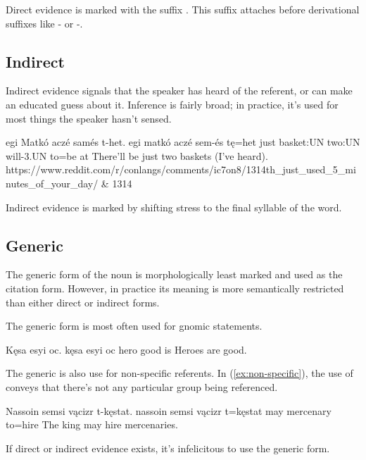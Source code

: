 Direct evidence is marked with the suffix . This suffix attaches before derivational suffixes like - or -.

\subsection{Indirect}
Indirect evidence signals that the speaker has heard of the referent, or can make an educated guess about it. Inference is fairly broad; in practice, it's used for most things the speaker hasn't sensed. 

\begin{examples*}
    \ex \label{ex:indirect_evidence}
        \script egi Matkó aczé samés t-het.
        \bits egi matkó aczé sem-és tę=het
        \gloss just basket:UN two:UN will-3.UN to={be at}
        \tr There'll be just two baskets (I've heard).
        \smoyd https://www.reddit.com/r/conlangs/comments/ic7on8/1314th_just_used_5_minutes_of_your_day/ & 1314
\end{examples*}

Indirect evidence is marked by shifting stress to the final syllable of the word.

\subsection{Generic}
The generic form of the noun is morphologically least marked and used as the citation form. However, in practice its meaning is more semantically restricted than either direct or indirect forms.

The generic form is most often used for gnomic statements.

\begin{example}
    \script Kęsa esyi oc.
    \bits kęsa esyi oc
    \gloss hero good is
    \tr Heroes are good.
\end{example}

The generic is also use for non-specific referents. In (\ref{ex:non-specific}), the use of  conveys that there's not any particular group being referenced.

\begin{example} \label{ex:non-specific}
    \script Nassoin semsi vącizr t-kęstat.
    \bits nassoin semsi vącizr t=kęstat
     may mercenary to=hire
    \tr The king may hire mercenaries.
\end{example}

If direct or indirect evidence exists, it's infelicitous to use the generic form.


